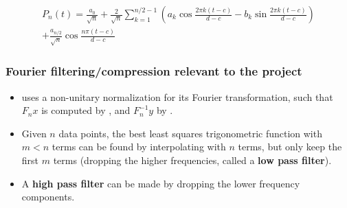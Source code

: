 \begin{gather*}
    P_n(t) = \frac{a_0}{\sqrt{n}}  
    + \frac{2}{\sqrt{n}} \sum_{k=1}^{n/2-1} \left( a_k \cos{\frac{2 \pi k (t-c)}{d-c}} - b_k \sin{\frac{2 \pi k (t-c)}{d-c}} \right) \\
    + \frac{a_{n/2}}{\sqrt{n}} \cos{\frac{n \pi (t-c)}{d-c}}
\end{gather*}

\subsubsection{Fourier filtering/compression relevant to the project}
\begin{itemize}
    \item {} uses a non-unitary normalization for its Fourier transformation, such that $F_n x$ is computed by , and $F_n^{-1} y$ by .
    \item Given $n$ data points, the best least squares trigonometric function with $m < n$ terms can be found by interpolating with $n$ terms, but only keep the first $m$ terms (dropping the higher frequencies, called a \textbf{low pass filter}).
    \item A \textbf{high pass filter} can be made by dropping the lower frequency components.
\end{itemize}